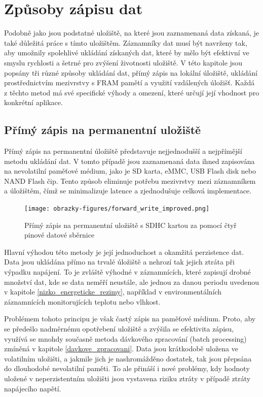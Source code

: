 
\section{Způsoby zápisu dat}
Podobně jako jsou podstatné uložiště, na které jsou zaznamenaná data získaná, je také důležitá práce s tímto uložištěm. Záznamníky dat musí být navrženy tak, aby umožnily spolehlivé ukládání získaných dat, které by mělo být efektivní ve smyslu rychlosti a šetrné pro zvýšení životnosti uložiště. V této kapitole jsou popsány tři různé způsoby ukládání dat, přímý zápis na lokální úložiště, ukládání prostřednictvím mezivrstvy s FRAM pamětí a využití vzdálených úložišť. Každá z těchto metod má své specifické výhody a omezení, které určují její vhodnost pro konkrétní aplikace.

\subsection{Přímý zápis na permanentní uložiště}
Přímý zápis na permanentní úložiště představuje nejjednodušší a nejpřímější metodu ukládání dat. V tomto případě jsou zaznamenaná data ihned zapisována na nevolatilní paměťové médium, jako je SD karta, eMMC, USB Flash disk nebo NAND Flash čip. Tento způsob eliminuje potřebu mezivrstvy mezi záznamníkem a úložištěm, čímž se minimalizuje latence a zjednodušuje celková implementace.

\begin{figure}[h]
    \centering
    \texttt{[image: obrazky-figures/forward\_write\_improved.png]}
    
    \caption{Přímý zápis na permanentní uložiště s SDHC kartou za pomocí čtyř pinové datové sběrnice}
    \label{fig:forward-write}
\end{figure}

Hlavní výhodou této metody je její jednoduchost a okamžitá perzistence dat. Data jsou ukládána přímo na trvalé úložiště a nehrozí tak jejich ztráta při výpadku napájení. To je zvláště výhodné v záznamnících, které zapisují drobné množství dat, kde se data neměří neustále, ale jednou za danou periodu uvedenou v kapitole \ref{nizko_energeticke_rezimy}, například v environmentálních záznamnících monitorujících teplotu nebo vlhkost.

Problémem tohoto principu je však častý zápis na paměťové médium. Proto, aby se předešlo nadměrnému opotřebení uložiště a zvýšila se efektivita zápisu, využívá se mnohdy současně metoda dávkového zpracování (batch processing) zmíněná v kapitole \ref{davkove_zpracovani}. Data jsou krátkodobě uložena ve volatilním uložišti, a jakmile jich je nashromážděno dostatek, tak jsou přepsána do dlouhodobé nevolatilní paměti. To ale přináší i nové problémy, kdy hodnoty uložené v neperzistentním uložišti jsou vystavena riziku ztráty v případě ztráty napájecího napětí.

